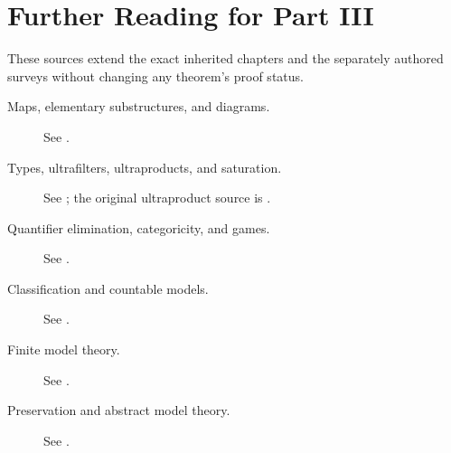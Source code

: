 \chapter*{Further Reading for Part III}
\label{sec:p03-further-reading}

These sources extend the exact inherited chapters and the separately authored
surveys without changing any theorem's proof status.

\begin{description}
  \item[Maps, elementary substructures, and diagrams.]
    See \textcite{Marker2002,Hodges1993}.
  \item[Types, ultrafilters, ultraproducts, and saturation.]
    See \textcite{ChangKeisler1990,Marker2002}; the original ultraproduct source
    is \textcite{Los1955Ultraproducts}.
  \item[Quantifier elimination, categoricity, and games.]
    See \textcite{Hodges1993,Marker2002}.
  \item[Classification and countable models.]
    See \textcite{Fraisse1954,Rado1964,Marker2002,Hodges1993,
    BaldwinLachlan1971,Shelah1971NonIsomorphicModels,TentZiegler2012}.
  \item[Finite model theory.]
    See \textcite{EbbinghausFlum1995,Libkin2004}.
  \item[Preservation and abstract model theory.]
    See \textcite{RobinsonJointConsistency1956,Beth1953,Craig1957,
    ChangKeisler1990,Lindstrom1969,BarwiseFeferman1985,Keisler1970,
    Vaananen2007}.
\end{description}
